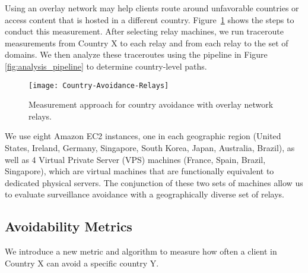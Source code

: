 
Using an overlay network may
help clients route around unfavorable countries or access content that
is hosted in a different country.  Figure~\ref{fig:avoidance_relays}
shows the steps to conduct this measurement. 
After selecting relay machines, we run traceroute measurements from
Country X to each relay and from each relay to the set of domains. We
then analyze these traceroutes using the pipeline in Figure
\ref{fig:analysis_pipeline} to determine country-level paths. 

\begin{figure}[t]
\centering
\texttt{[image: Country-Avoidance-Relays]}
\caption{Measurement approach for country avoidance with overlay network relays.}
\label{fig:avoidance_relays}
\end{figure}

We use eight Amazon EC2 instances, one in each geographic region (United States, Ireland, Germany, Singapore, South Korea, Japan, Australia, Brazil), as well as 4 Virtual Private Server (VPS) machines (France, Spain, Brazil, Singapore), which are virtual machines that are functionally equivalent to dedicated physical servers.  The conjunction of these two sets of machines allow us to evaluate surveillance avoidance with a geographically diverse set of relays. 

\subsection{Avoidability Metrics}
\label{metrics}

We introduce a new metric and algorithm to measure how often a client in
Country X can avoid a specific country Y.  

